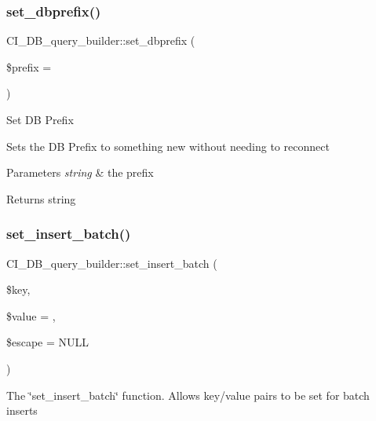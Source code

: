 \subsubsection{\texorpdfstring{set\+\_\+dbprefix()}{set\_dbprefix()}}
{\footnotesize\ttfamily C\+I\+\_\+\+D\+B\+\_\+query\+\_\+builder\+::set\+\_\+dbprefix (\begin{DoxyParamCaption}\item[{}]{\$prefix = {\ttfamily \textquotesingle{}\textquotesingle{}} }\end{DoxyParamCaption})}

Set DB Prefix

Set\textquotesingle{}s the DB Prefix to something new without needing to reconnect


\begin{DoxyParams}{Parameters}
{\em string} & the prefix \\
\hline
\end{DoxyParams}
\begin{DoxyReturn}{Returns}
string 
\end{DoxyReturn}
\mbox{\label{class_c_i___d_b__query__builder_ad79818e227912b140faa30c7ad6015aa}} 
\subsubsection{\texorpdfstring{set\+\_\+insert\+\_\+batch()}{set\_insert\_batch()}}
{\footnotesize\ttfamily C\+I\+\_\+\+D\+B\+\_\+query\+\_\+builder\+::set\+\_\+insert\+\_\+batch (\begin{DoxyParamCaption}\item[{}]{\$key,  }\item[{}]{\$value = {\ttfamily \textquotesingle{}\textquotesingle{}},  }\item[{}]{\$escape = {\ttfamily NULL} }\end{DoxyParamCaption})}

The \char`\"{}set\+\_\+insert\+\_\+batch\char`\"{} function. Allows key/value pairs to be set for batch inserts


